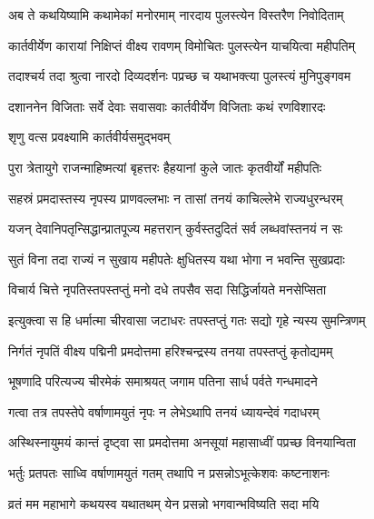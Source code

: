 \twolineshloka
{अब ते कथयिष्यामि कथामेकां मनोरमाम्}
{नारदाय पुलस्त्येन विस्तरैण निवोदिताम्} %

\twolineshloka
{कार्तवीर्येण कारायां निक्षिप्तं वीक्ष्य रावणम्}
{विमोचितः पुलस्त्येन याचयित्वा महीपतिम्} %

\twolineshloka
{तदाश्चर्य तदा श्रुत्वा नारदो दिव्यदर्शनः}
{पप्रच्छ च यथाभक्त्या पुलस्त्यं मुनिपुङ्गवम} %


\twolineshloka
{दशाननेन विजिताः सर्वे देवाः सवासवाः}
{कार्तवीर्येण विजिताः कथं रणविशारदः} %



\onelineshloka
{शृणु वत्स प्रवक्ष्यामि कार्तवीर्यसमुद्भवम्} %

\twolineshloka
{पुरा त्रेतायुगे राजन्माहिष्मत्यां बृहत्तरः}
{हैहयानां कुले जातः कृतवीर्यों महीपतिः} %

\twolineshloka
{सहस्रं प्रमदास्तस्य नृपस्य प्राणवल्लभाः}
{न तासां तनयं काचिल्लेभे राज्यधुरन्धरम्} %

\twolineshloka
{यजन् देवानिपतृन्सिद्धान्प्रातपूज्य महत्तरान्}
{कुर्वस्तदुदितं सर्व लब्धवांस्तनयं न सः} %

\twolineshloka
{सुतं विना तदा राज्यं न सुखाय महीपतेः}
{क्षुधितस्य यथा भोगा न भवन्ति सुखप्रदाः} %

\twolineshloka
{विचार्य चित्ते नृपतिस्तपस्तप्तुं मनो दधे}
{तपसैव सदा सिद्धिर्जायते मनसेप्सिता} %

\twolineshloka
{इत्युक्त्वा स हि धर्मात्मा चीरवासा जटाधरः}
{तपस्तप्तुं गतः सद्यो गृहे न्यस्य सुमन्त्रिणम्} %

\twolineshloka
{निर्गतं नृपतिं वीक्ष्य पद्मिनी प्रमदोत्तमा}
{हरिश्चन्द्रस्य तनया तपस्तप्तुं कृतोद्यमम्} %

\twolineshloka
{भूषणादि परित्यज्य चीरमेकं समाश्रयत्}
{जगाम पतिना सार्ध पर्वते गन्धमादने} %

\twolineshloka
{गत्वा तत्र तपस्तेपे वर्षाणामयुतं नृपः}
{न लेभेऽथापि तनयं ध्यायन्देवं गदाधरम्} %

\twolineshloka
{अस्थिस्नायुमयं कान्तं दृष्ट्वा सा प्रमदोत्तमा}
{अनसूयां महासाध्वीं पप्रच्छ विनयान्विता} %

\twolineshloka
{भर्तुः प्रतपतः साध्वि वर्षाणामयुतं गतम्}
{तथापि न प्रसन्नोऽभूत्केशवः कष्टनाशनः} %

\twolineshloka
{व्रतं मम महाभागे कथयस्व यथातथम्}
{येन प्रसन्नो भगवान्भविष्यति सदा मयि} %

